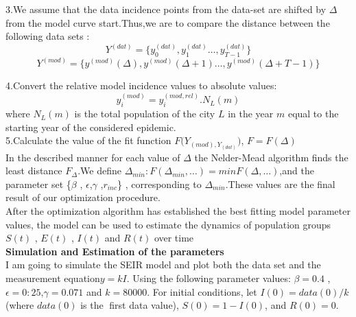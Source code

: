 \documentclass{exam}
\begin{document}
3.We assume that the data incidence points from the data-set are shifted by $\Delta$ from the model curve start.Thus,we are to compare the distance between the following data sets :
\begin{equation*}
Y^{(dat)} = \{y_0^{(dat)},y_1^{(dat)} \ldots ,y_{T-1}^{(dat)}\}
\end{equation*}
\begin{equation*}
Y^{(mod)} = \{y^{(mod)}(\Delta),y^{(mod)}(\Delta + 1 ) \ldots ,y^{(mod)}(\Delta+T-1)\}
\end{equation*}

4.Convert the relative model incidence values to absolute values:
\begin{equation}
y_i^{(mod)}=y_i^{(mod,rel)}.N_L(m)
\end{equation}
where $N_L(m)$ is the total population of the city $L$ in the year $m$ equal to the starting year of the considered epidemic.\\

5.Calculate the value of the fit function $F\big(Y_{(mod),Y_{(dat)}}\big)$, $F=F(\Delta)$\\

In the described manner for each value of $\Delta$ the Nelder-Mead algorithm finds the least distance $F_{\Delta}$.We define $\Delta_{min} : F(\Delta_{min},\ldots)=min F(\Delta,\ldots)$,and the parameter set
\{$\beta$ , $\epsilon$,$\gamma$ ,$r_{inc}$\} , corresponding to $\Delta_{min}$.These values are the final result of our optimization procedure.\\

After the optimization algorithm has established the best fitting model parameter
values, the model can be used to estimate the dynamics of population groups $S(t)$ , $E(t)$ , $I(t)$ and $R(t)$ over time\\

\textbf{Simulation and Estimation of the parameters} \\
I am going to simulate the SEIR model and plot both the data set and the measurement equation$y=k I$. Using the following parameter values: $\beta=0.4$ ,$\epsilon= 0:25$,$\gamma = 0.071$ and $k=80000$. For initial conditions, let $I(0)=data(0)/k$ (where $data(0)$ is the first data value), $S(0) = 1-I(0) $, and $R(0) = 0$.\\
\end{document}
